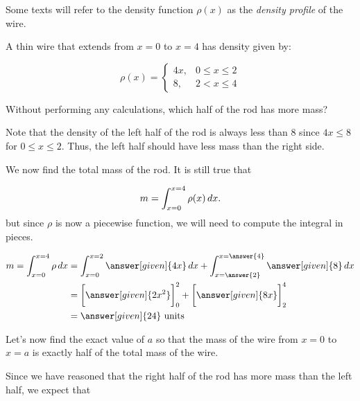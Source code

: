\documentclass{ximera}
\begin{document}
\begin{remark}
Some texts will refer to the density function $\rho(x)$ as the \emph{density profile} of the wire.
\end{remark}

\begin{example}
A thin wire that extends from $x=0$ to $x=4$ has density given by:

\[ \rho(x) = \left\{ 
\begin{array}{cl}
4x, & 0 \leq x\leq 2 \\
8 ,& 2 < x \leq 4
\end{array} \right.
\]

Without performing any calculations, which half of the rod has more mass?

\begin{multipleChoice}
\end{multipleChoice}

\begin{explanation}
Note that the density of the left half of the rod is always less than 8 since $4x \leq 8$ for $0\leq x \leq 2$.  Thus, the left half should have less mass than the right side.


We now find the total mass of the rod.  It is still true that

\[
m = \int_{x=0}^{x=4} \rho(x) \mathop{}\!d x.
\]
but since $\rho$ is now a piecewise function, we will need to compute the integral in pieces.  

\begin{align*}
m = \int_{x=0}^{x=4} \rho \d x & = \int_{x=0}^{x=2} \answer[given]{4x} \d x + \int_{x=\answer{2}}^{x=\answer{4}} \answer[given]{8} \d x \\
&= \eval{\answer[given]{2x^2}}_0^2+\eval{\answer[given]{8x}}_2^4 \\
&= \answer[given]{24} \textrm{ units}
\end{align*}
\end{explanation}

Let's now find the exact value of $a$ so that the mass of the wire from $x=0$ to $x=a$ is exactly half of the total mass of the wire. 

\begin{explanation}
Since we have reasoned that the right half of the rod has more mass than the left half, we expect that

\begin{multipleChoice}
\end{multipleChoice}
 

\end{explanation}
\end{example}
\end{document}
